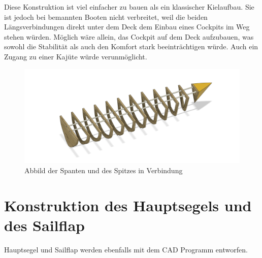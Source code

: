Diese Konstruktion ist viel einfacher zu bauen als ein klassischer Kielaufbau. Sie ist jedoch bei bemannten Booten nicht verbreitet, weil die beiden Längsverbindungen direkt unter dem Deck dem Einbau eines Cockpits im Weg stehen würden. Möglich wäre allein, das Cockpit auf dem Deck aufzubauen, was sowohl die Stabilität als auch den Komfort stark beeinträchtigen würde. Auch ein Zugang zu einer Kajüte würde verunmöglicht.
\begin{figure}[H]
    \centering
    \includegraphics[width=1\linewidth]{assets/full_skellet.png}
    \caption{Abbild der Spanten und des Spitzes in Verbindung}
    
\end{figure}


\section{Konstruktion des Hauptsegels und des Sailflap}
Hauptsegel und Sailflap werden ebenfalls mit dem CAD Programm entworfen. 
